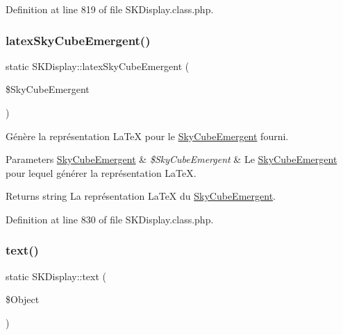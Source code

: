 Definition at line 819 of file S\+K\+Display.\+class.\+php.

\mbox{\label{class_s_k_display_ab294596804a852aff33a6ae4c43b824a}} 
\subsubsection{\texorpdfstring{latex\+Sky\+Cube\+Emergent()}{latexSkyCubeEmergent()}}
{\footnotesize\ttfamily static S\+K\+Display\+::latex\+Sky\+Cube\+Emergent (\begin{DoxyParamCaption}\item[{}]{\$\+Sky\+Cube\+Emergent }\end{DoxyParamCaption})\hspace{0.3cm}{\ttfamily [static]}}

Génère la représentation La\+TeX pour le \hyperlink{class_sky_cube_emergent}{Sky\+Cube\+Emergent} fourni.


\begin{DoxyParams}[1]{Parameters}
\hyperlink{class_sky_cube_emergent}{Sky\+Cube\+Emergent} & {\em \$\+Sky\+Cube\+Emergent} & Le \hyperlink{class_sky_cube_emergent}{Sky\+Cube\+Emergent} pour lequel générer la représentation La\+TeX. \\
\hline
\end{DoxyParams}
\begin{DoxyReturn}{Returns}
string La représentation La\+TeX du \hyperlink{class_sky_cube_emergent}{Sky\+Cube\+Emergent}. 
\end{DoxyReturn}


Definition at line 830 of file S\+K\+Display.\+class.\+php.

\mbox{\label{class_s_k_display_a890c2827ea7d0ce8f9ec3e8cc56e9ccf}} 
\subsubsection{\texorpdfstring{text()}{text()}}
{\footnotesize\ttfamily static S\+K\+Display\+::text (\begin{DoxyParamCaption}\item[{}]{\$\+Object }\end{DoxyParamCaption})\hspace{0.3cm}{\ttfamily [static]}}

